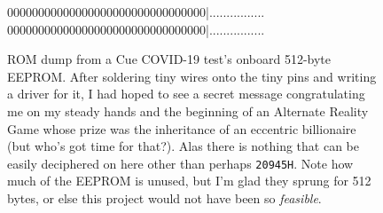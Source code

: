 \documentclass[twocolumn]{article}
\begin{document}
\begin{figure}
{00\hspace{0.3em}00\hspace{0.3em}00\hspace{0.3em}00\hspace{0.3em}00\hspace{0.3em}00\hspace{0.3em}00\hspace{0.3em}00\hspace{0.3em}00\hspace{0.3em}00\hspace{0.3em}00\hspace{0.3em}00\hspace{0.3em}00\hspace{0.3em}00\hspace{0.3em}00\hspace{0.3em}00\hspace{0.3em}|\hspace{0.3em}................\\[-0.25em]
00\hspace{0.3em}00\hspace{0.3em}00\hspace{0.3em}00\hspace{0.3em}00\hspace{0.3em}00\hspace{0.3em}00\hspace{0.3em}00\hspace{0.3em}00\hspace{0.3em}00\hspace{0.3em}00\hspace{0.3em}00\hspace{0.3em}00\hspace{0.3em}00\hspace{0.3em}00\hspace{0.3em}00\hspace{0.3em}|\hspace{0.3em}................\\[-0.25em]
}
\caption{ROM dump from a Cue COVID-19 test's onboard 512-byte EEPROM.
  After soldering tiny wires onto the tiny pins and writing a driver
  for it, I had hoped to see a secret message congratulating me on my
  steady hands and the beginning of an Alternate Reality Game whose
  prize was the inheritance of an eccentric billionaire (but who's got
  time for that?). Alas there is nothing that can be easily deciphered
  on here other than perhaps {\tt 20945H}. Note how much of the EEPROM
  is unused, but I'm glad they sprung for 512 bytes, or else this
  project would not have been so {\em feasible}. } \label{fig:romdump}
\end{figure}
\end{document}
